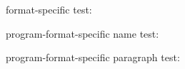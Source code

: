 \documentclass{article}
\begin{document}
format-specific test: 

program-format-specific name test: 

program-format-specific paragraph test: 
\end{document}
